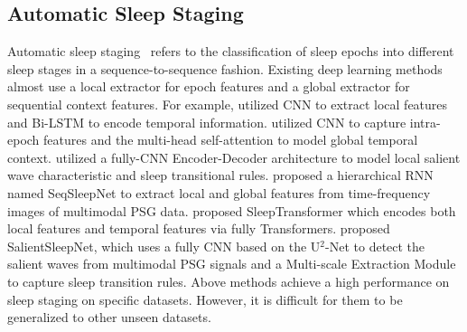 \documentclass[letterpaper]{article} %
\begin{document}
	\subsection{Automatic Sleep Staging}
	Automatic sleep staging~\citep{melek2021automatic} refers to the classification of sleep epochs into different sleep stages in a sequence-to-sequence fashion.
	Existing deep learning methods almost use a local extractor for epoch features and a global extractor for sequential context features.
	For example, \citet{Supratak2017DeepSleepNetAM, Supratak2020TinySleepNetAE} utilized CNN to extract local features and Bi-LSTM to encode temporal information.
	\citet{Qu2020ARB, Eldele2021AnAD, wang2023narcolepsy} utilized CNN to capture intra-epoch features and the multi-head self-attention to model global temporal context.
	\citet{Perslev2019UTimeAF} utilized a fully-CNN Encoder-Decoder architecture to model local salient wave characteristic and sleep transitional rules.
	\citet{Phan2019SeqSleepNetEH} proposed a hierarchical RNN named SeqSleepNet to extract local and global features from time-frequency images of multimodal PSG data.
	\citet{Phan2022SleepTransformerAS} proposed SleepTransformer which encodes both local features and temporal features via fully Transformers.
	\citet{Jia2021SalientSleepNetMS} proposed SalientSleepNet, which uses a fully CNN based on the U$^2$-Net to detect the salient waves from multimodal PSG signals and a Multi-scale Extraction Module to capture sleep transition rules.
	Above methods achieve a high performance on sleep staging on specific datasets.
	However, it is difficult for them to be generalized to other unseen datasets.

\end{document}
